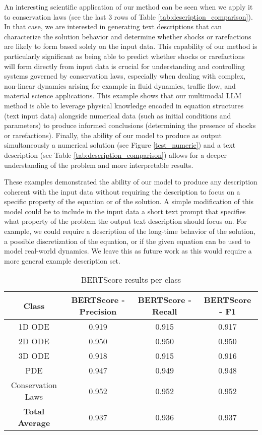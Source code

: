 \documentclass{article}
\begin{document}
An interesting scientific application of our method can be seen when we apply it to conservation laws (see the last 3 rows of Table \ref{tab:description_comparison}). In that case, we are interested in generating text descriptions that can characterize the solution behavior and determine whether shocks or rarefactions are likely to form based solely on the input data.  This capability of our method is particularly significant as being able to predict whether shocks or rarefactions will form directly from input data is crucial for understanding and controlling systems governed by conservation laws, especially when dealing with complex, non-linear dynamics arising for example in fluid dynamics, traffic flow, and material science applications. This example shows that our multimodal LLM method is able to leverage physical knowledge encoded in equation structures (text input data) alongside numerical data (such as initial conditions and parameters) to produce informed conclusions (determining the presence of shocks or rarefactions).
Finally, the ability of our model to produce as output simultaneously a numerical solution (see Figure \ref{test_numeric}) and a text description (see Table \ref{tab:description_comparison}) allows for a deeper understanding of the problem and more interpretable results.

These examples demonstrated the ability of our model to produce any description coherent with the input data without requiring the description to focus on a specific property of the equation or of the solution. A simple modification of this model could be to include in the input data a short text prompt that specifies what property of the problem the output text description should focus on. For example, we could require a description of the long-time behavior of the solution, a possible discretization of the equation, or if the given equation can be used to model real-world dynamics. We leave this as future work as this would require a more general example description set.

\begin{table}[t]
\centering
\begin{tabular}{|c|c|c|c|}
\hline
\textbf{Class} & \textbf{BERTScore - Precision} & \textbf{BERTScore - Recall} & \textbf{BERTScore - F1} \\ \hline
1D ODE & 0.919 & 0.915 & 0.917 \\ \hline
2D ODE & 0.950 & 0.950 & 0.950 \\ \hline
3D ODE & 0.918 & 0.915 & 0.916 \\ \hline
PDE & 0.947 & 0.949 & 0.948 \\ \hline
Conservation Laws & 0.952 & 0.952 & 0.952 \\ \hline
\textbf{Total Average} & 0.937 & 0.936 & 0.937 \\ \hline
\end{tabular}
\caption{BERTScore results per class}
\label{BERTscore}
\end{table}
\end{document}
